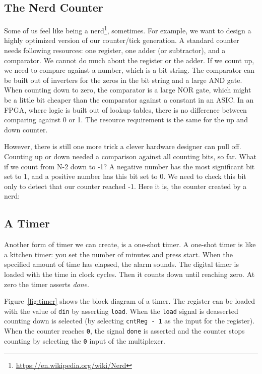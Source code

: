 \documentclass[%
    10pt,
    headinclude, footexclude,
    openright, %
    notitlepage,
    cleardoubleempty,
    headsepline,
    pointlessnumbers,
    bibtotoc, idxtotoc,
    ]{scrbook}
\newcommand{\code}[1]{{\small{\texttt{#1}}}}
\newcommand{\myref}[2]{\href{#1}{#2}}
\renewcommand{\myref}[2]{{#2}{\footnote{\url{#1}}}}
\begin{document}
\subsection{The Nerd Counter}

Some of us feel like being a \myref{https://en.wikipedia.org/wiki/Nerd}{nerd}, sometimes.
For example, we want to design a highly optimized version of our counter/tick generation.
A standard counter needs following resources: one register, one adder (or subtractor),
and a comparator. We cannot do much about the register or the adder. If we count
up, we need to compare against a number, which is a bit string. The comparator
can be built out of inverters for the zeros in the bit string and a large AND gate.
When counting down to zero, the comparator is a large NOR gate, which might be
a little bit cheaper than the comparator against a constant in an ASIC.
In an FPGA, where logic is built out of lookup tables, there is no difference between comparing
against 0 or 1. The resource requirement is the same for the up and down counter.

However, there is still one more trick a clever hardware designer can pull off.
Counting up or down needed a comparison against all counting bits, so far.
What if we count from N-2 down to -1? A negative number has the most significant bit
set to 1, and a positive number has this bit set to 0. We need to check this bit only to detect
that our counter reached -1. Here it is, the counter created by a nerd:



\subsection{A Timer}

Another form of timer we can create, is a one-shot timer. A one-shot timer is like a
kitchen timer: you set the number of minutes and press start. When the specified amount
of time has elapsed, the alarm sounds.
The digital timer is loaded with the time in clock cycles.
Then it counts down until reaching zero. At zero the timer asserts \emph{done}.

Figure~\ref{fig:timer} shows the block diagram of a timer. The register can be loaded with
the value of \code{din} by asserting \code{load}. When the \code{load} signal is deasserted
counting down is selected (by selecting \code{cntReg - 1} as the input for the register).
When the counter reaches \code{0}, the signal \code{done} is asserted and the counter stops
counting by selecting the \code{0} input of the multiplexer.
\end{document}
